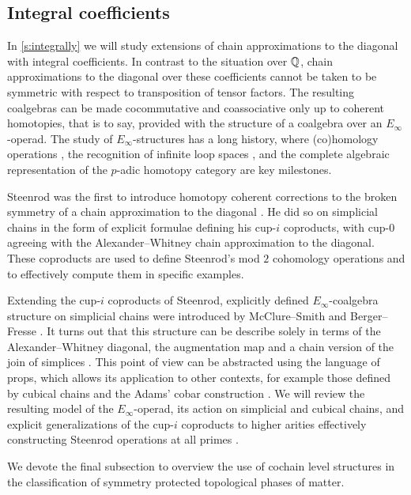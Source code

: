 \subsection*{Integral coefficients}

In \cref{s:integrally} we will study extensions of chain approximations to the diagonal with integral coefficients.
In contrast to the situation over $\mathbb{Q}$, chain approximations to the diagonal over these coefficients cannot be taken to be symmetric with respect to transposition of tensor factors.
The resulting coalgebras can be made cocommutative and coassociative only up to coherent homotopies, that is to say, provided with the structure of a coalgebra over an $E_\infty$-operad.
The study of $E_\infty$-structures has a long history, where (co)homology operations \cite{steenrod1962cohomology, may1970general}, the recognition of infinite loop spaces \cite{boardman1973homotopy, may1972geometry}, and the complete algebraic representation of the $p$-adic homotopy category \cite{mandell2001padic} are key milestones.

Steenrod was the first to introduce homotopy coherent corrections to the broken symmetry of a chain approximation to the diagonal \cite{steenrod1947products}.
He did so on simplicial chains in the form of explicit formulae defining his cup-$i$ coproducts, with \mbox{cup-$0$} agreeing with the Alexander--Whitney chain approximation to the diagonal.
These coproducts are used to define Steenrod's mod $2$ cohomology operations and to effectively compute them in specific examples.

Extending the cup-$i$ coproducts of Steenrod, explicitly defined $E_\infty$-coalgebra structure on simplicial chains were introduced by McClure--Smith \cite{mcclure2003multivariable} and Berger--Fresse \cite{berger2004combinatorial}.
It turns out that this structure can be describe solely in terms of the Alexander--Whitney diagonal, the augmentation map and a chain version of the join of simplices \cite{medina2020prop1}.
This point of view can be abstracted using the language of props, which allows its application to other contexts, for example those defined by cubical chains \cite{medina2022cube_einfty} and the Adams' cobar construction \cite{medina2021cobar}.
We will review the resulting model of the $E_\infty$-operad, its action on simplicial and cubical chains, and explicit generalizations of the cup-$i$ coproducts to higher arities effectively constructing Steenrod operations at all primes \cite{medina2021may_st}.

We devote the final subsection to overview the use of cochain level structures in the classification of symmetry protected topological phases of matter.
